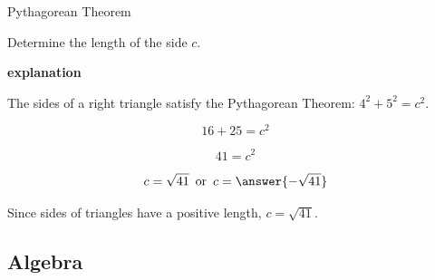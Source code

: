 \documentclass{ximera}
\begin{document}
\begin{example} Pythagorean Theorem


Determine the length of the side $c$. 






\begin{image}[3in]
  \end{image}



\textbf{\textcolor{red!75!green}{explanation}} 

The sides of a right triangle satisfy the Pythagorean Theorem: $4^2 + 5^2 = c^2$.


\[  16 + 25 = c^2       \]

\[  41 = c^2     \]

\[  c = \sqrt{41} \, \text{ or } \, c = \answer{-\sqrt{41}}    \]



Since sides of triangles have a positive length, $c = \sqrt{41}$.








\end{example}






















\subsection*{Algebra}
\end{document}
